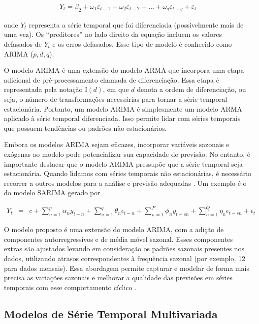 \begin{eqnarray}
	Y_t = \beta_2 + \omega_1\varepsilon_{t-1} + \omega_2 \varepsilon_{t-2} +\ldots+ \omega_q \varepsilon_{t-q} + \varepsilon_t \label{arima}
\end{eqnarray}

\noindent onde $Y_t$ representa a série temporal que foi diferenciada (possivelmente mais de uma vez). Os ``preditores'' no lado direito da equação incluem os valores defasados de $Y_t$ e os erros defasados. Esse tipo de modelo é conhecido como ARIMA ($p, d, q$).

O modelo ARIMA é uma extensão do modelo ARMA que incorpora uma etapa adicional de pré-processamento chamada de diferenciação. Essa etapa é representada pela notação I$(d)$, em que $d$ denota a ordem de diferenciação, ou seja, o número de transformações necessárias para tornar a série temporal estacionária. Portanto, um modelo ARIMA é simplesmente um modelo ARMA aplicado à série temporal diferenciada. Isso permite lidar com séries temporais que possuem tendências ou padrões não estacionários.

Embora os modelos ARIMA sejam eficazes, incorporar variáveis sazonais e exógenas ao modelo pode potencializar sua capacidade de previsão. No entanto, é importante destacar que o modelo ARIMA pressupõe que a série temporal seja estacionária. Quando lidamos com séries temporais não estacionárias, é necessário recorrer a outros modelos para a análise e previsão adequadas  \cite{arima}. Um exemplo é o do modelo SARIMA gerado por



\begin{eqnarray}
	Y_t&=&c+\sum_{n=1}^p \alpha_n y_{t-n}+\sum_{n=1}^q \theta_n \epsilon_{t-n}+\sum_{n=1}^P \phi_n y_{t-s n}+\sum_{n=1}^Q \eta_n \epsilon_{t-s n}+\epsilon_t \label{sarima}
\end{eqnarray}

O modelo proposto é uma extensão do modelo ARIMA, com a adição de componentes autorregressivos e de média móvel sazonal. Esses componentes extras são ajustados levando em consideração os padrões sazonais presentes nos dados, utilizando atrasos correspondentes à frequência sazonal (por exemplo, 12 para dados mensais). Essa abordagem permite capturar e modelar de forma mais precisa as variações sazonais e melhorar a qualidade das previsões em séries temporais com esse comportamento cíclico \cite{sarima}.

\subsection{Modelos de S\'erie Temporal Multivariada}\label{subsec:mult}

